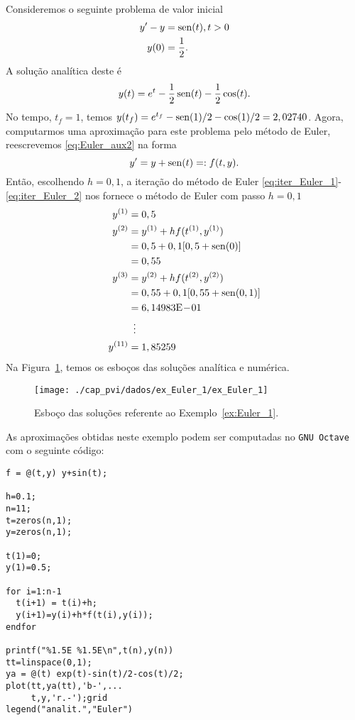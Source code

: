 \begin{ex}\label{ex:Euler_1}
  Consideremos o seguinte problema de valor inicial
  \begin{align}
    y' - y &= \operatorname{sen}(t), t>0\label{eq:Euler_aux2}\\
    y(0) &= \frac{1}{2}.
  \end{align}
  A solução analítica deste é
  \begin{equation}
    y(t) = e^t - \frac{1}{2}\operatorname{sen}(t) - \frac{1}{2}\cos(t).
  \end{equation}
No tempo, $t_f=1$, temos $y(t_f)=e^{t_f} - \operatorname{sen}(1)/2 - \cos(1)/2 = 2,02740$. Agora, computarmos uma aproximação para este problema pelo método de Euler, reescrevemos \eqref{eq:Euler_aux2} na forma
\begin{equation}
  y' = y + \operatorname{sen}(t) =: f(t,y).
\end{equation}
Então, escolhendo $h=0,1$, a iteração do método de Euler \eqref{eq:iter_Euler_1}-\eqref{eq:iter_Euler_2} nos fornece
o método de Euler com passo $h=0,1$
\begin{align}
  y^{(1)} &= 0,5\\
  y^{(2)} &= y^{(1)} + hf(t^{(1)},y^{(1)})\nonumber\\
  &= 0,5 + 0,1[0,5 + \operatorname{sen}(0)]\nonumber\\
  &= 0,55\\
  y^{(3)} &= y^{(2)} + hf(t^{(2)},y^{(2)})\nonumber\\
  &= 0,55 + 0,1[0,55 + \operatorname{sen}(0,1)]\nonumber\\
  &= 6,14983\mathrm{E}\!-\!01\\
  &\,~\vdots\nonumber\\
  y^{(11)} &= 1,85259
\end{align}
Na Figura~\ref{fig:ex_Euler_1}, temos os esboços das soluções analítica e numérica.

\begin{figure}[h!]
  \centering
  \texttt{[image: ./cap\_pvi/dados/ex\_Euler\_1/ex\_Euler\_1]}
  \caption{Esboço das soluções referente ao Exemplo~\ref{ex:Euler_1}.}
  \label{fig:ex_Euler_1}
\end{figure}

\ifisoctave
As aproximações obtidas neste exemplo podem ser computadas no \verb+GNU Octave+ com o seguinte código:
\begin{verbatim}
f = @(t,y) y+sin(t);

h=0.1;
n=11;
t=zeros(n,1);
y=zeros(n,1);

t(1)=0;
y(1)=0.5;

for i=1:n-1
  t(i+1) = t(i)+h;
  y(i+1)=y(i)+h*f(t(i),y(i));
endfor

printf("%1.5E %1.5E\n",t(n),y(n))
tt=linspace(0,1);
ya = @(t) exp(t)-sin(t)/2-cos(t)/2;
plot(tt,ya(tt),'b-',...
     t,y,'r.-');grid
legend("analit.","Euler")
\end{verbatim}
\fi
\end{ex}

